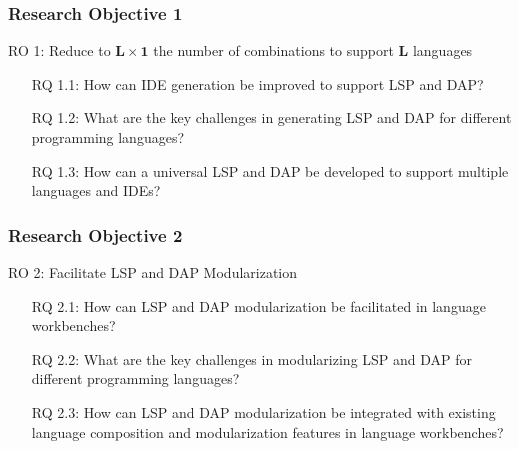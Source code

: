 \documentclass[9pt,xcolor=table,svgnames]{beamer}
\begin{document}
\begin{frame}
    \frametitle{Research Objective 1}

    \begin{center}
       \large \alert{RO 1}:
       \normalsize Reduce to $\mathbf{L} \times \mathbf{1}$ the number of combinations to support $\mathbf{L}$ languages
       \bigskip
    \end{center}

    \begin{center}
    \begin{minipage}{0.75\textwidth}
    \begin{itemize}
        \item[RQ 1.1:] How can IDE generation be improved to support LSP and DAP?
        \item[RQ 1.2:] What are the key challenges in generating LSP and DAP for different programming languages?
        \item[RQ 1.3:] How can a universal LSP and DAP be developed to support multiple languages and IDEs?
    \end{itemize}
    \end{minipage}
    \end{center}
\end{frame}

\begin{frame}
    \frametitle{Research Objective 2}

    \begin{center}
       \large \alert{RO 2}:
       \normalsize Facilitate LSP and DAP Modularization
       \bigskip
    \end{center}

    \begin{center}
    \begin{minipage}{0.75\textwidth}
    \begin{itemize}
        \item[RQ 2.1:] How can LSP and DAP modularization be facilitated in language workbenches?
        \item[RQ 2.2:] What are the key challenges in modularizing LSP and DAP for different programming languages?
        \item[RQ 2.3:] How can LSP and DAP modularization be integrated with existing language composition and modularization features in language workbenches?
    \end{itemize}
    \end{minipage}
    \end{center}
\end{frame}
\end{document}
